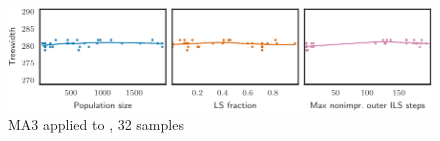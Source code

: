 \begin{figure}[h]\strictpagecheck\centering

\includegraphics[scale=0.85]{plots/MA3-correlation-regplots-flat300-26-0-0-crop.pdf}


\caption[Parameter influence for MA3 when applied to ]{\gls{MA3} applied to , 32 samples}

\label{MA3-correlation-regplots-flat300-26-0}

\end{figure}